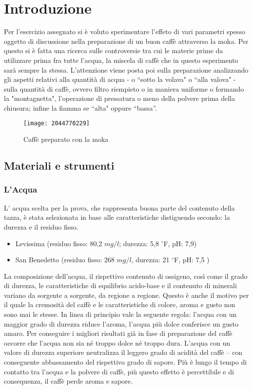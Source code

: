 \chapter{Introduzione}
Per l'esercizio assegnato si è voluto sperimentare l'effeto di vari parametri spesso oggetto di discussione nella preparazione di un buon caffè attraverso la moka.
Per questo si è fatta una ricerca sulle controversie tra cui le materie prime da utilizzare prima fra tutte l'acqua, la miscela di caffè che in questo esperimento sarà sempre la stessa. L'attenzione viene posta poi sulla preparazione analizzando gli aspetti relativi alla quantità di acqua - o “sotto la volava" o “alla valova" - sulla quantità di caffè, ovvero filtro riempieto o in maniera uniforme o formando la "montagnetta", l'operazione di pressatura o meno della polvere prima della chiusura; infine la fiamma se “alta" oppure “bassa”.
\begin{figure}[h]
  \centering
  \texttt{[image: 2044770229]}
  \caption{Caffè preparato con la moka}
  \label{fig:moka}
\end{figure}
\section{Materiali e strumenti}
\subsection{L'Acqua}
L' acqua scelta per la prova, che rappresenta buona parte del contenuto della tazza, è stata selezionata in base alle caratteristiche distiguendo secondo: la durezza e il residuo fisso.
\begin{itemize}
  \item Levissima (residuo fisso: 80,2 $mg/l$; durezza: 5,8 $^{\circ}$F, pH: 7,9)
  \item San Benedetto (residuo fisso: 268 $mg/l$, durezza: 21 $^{\circ}$F, pH: 7,5 )
\end{itemize}
La composizione dell’acqua, il rispettivo contenuto di ossigeno, così come il grado di durezza, le caratteristiche di equilibrio acido-base e il contenuto di minerali variano da sorgente a sorgente, da regione a regione. Questo è anche il motivo per il quale la cremosità del caffè e le caratteristiche di colore, aroma e gusto non sono mai le stesse.
In linea di principio vale la seguente regola: l’acqua con un maggior grado di durezza riduce l’aroma, l’acqua più dolce conferisce un gusto amaro.
Per conseguire i migliori risultati già in fase di preparazione del caffè occorre che l’acqua non sia né troppo dolce né troppo dura. L’acqua con un valore di durezza superiore neutralizza il leggero grado di acidità del caffè – con conseguente abbassamento del rispettivo grado di sapore. Più è lungo il tempo di contatto tra l'acqua e la polvere di caffè, più questo effetto è percettibile e di consequenza, il caffè perde aroma e sapore.\cite{mo_2017}\cite{acqua}

